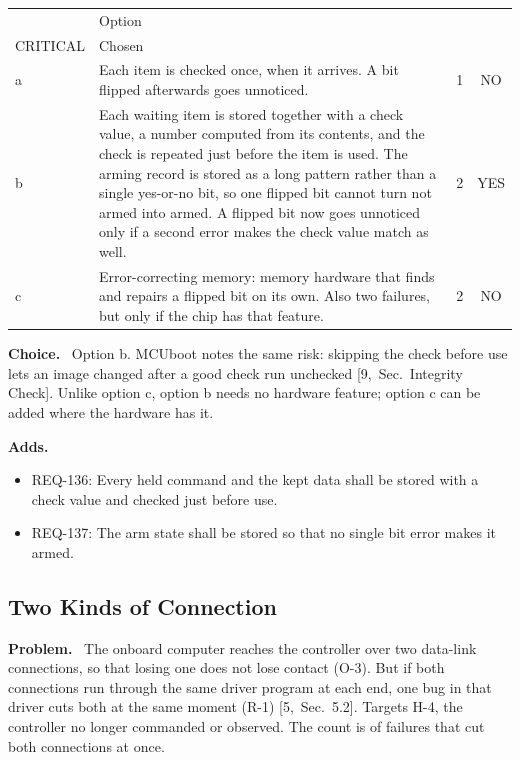 \documentclass[11pt,a4paper]{article}
\makeatletter
\newcommand{\sev}[2]{\begin{tabular}[b]{@{}c@{}}#1\\{\scriptsize #2}\end{tabular}}
\newcommand{\field}[1]{\par\needspace{4\baselineskip}\smallskip\noindent\textbf{#1.}~}
\makeatother
\begin{document}
\smallskip
{\small\noindent\begin{tabularx}{\textwidth}{@{}l>{\raggedright\arraybackslash}Xcc@{}}
\toprule
 & Option & \sev{H-6}{CRITICAL} & Chosen \\
\midrule
a & Each item is checked once, when it arrives. A bit flipped afterwards goes unnoticed. & 1 & NO \\
b & Each waiting item is stored together with a check value, a number computed from its contents, and the check is repeated just before the item is used. The arming record is stored as a long pattern rather than a single yes-or-no bit, so one flipped bit cannot turn not armed into armed. A flipped bit now goes unnoticed only if a second error makes the check value match as well. & 2 & YES \\
c & Error-correcting memory: memory hardware that finds and repairs a flipped bit on its own. Also two failures, but only if the chip has that feature. & 2 & NO \\
\bottomrule
\end{tabularx}}


\field{Choice} Option b. MCUboot notes the same risk: skipping the check
before use lets an image changed after a good check run unchecked
[9,~Sec.~Integrity Check]. Unlike option c, option b needs no hardware
feature; option c can be added where the hardware has it.

\field{Adds}
\begin{itemize}
\item REQ-136: Every held command and the kept data shall be stored with a check value and checked just before use.
\item REQ-137: The arm state shall be stored so that no single bit error makes it armed.
\end{itemize}

\subsection{Two Kinds of Connection}
\label{sec:links}
\field{Problem} The onboard computer reaches the controller over two
data-link connections, so that losing one does not lose contact (O-3). But if
both connections run through the same driver program at each end, one bug in
that driver cuts both at the same moment (R-1) [5,~Sec.~5.2]. Targets H-4, the
controller no longer commanded or observed. The count is of failures that cut
both connections at once.
\end{document}
